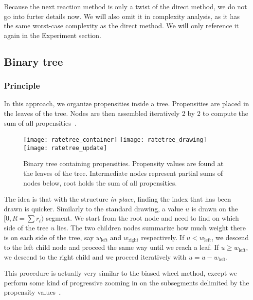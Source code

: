 Because the next reaction method is only a twist of the direct method, we do not go into furter details now. We will also omit it in complexity analysis, as it has the same worst-case complexity as the direct method. We will only reference it again in the Experiment section.

\subsection {Binary tree}

\subsubsection {Principle}

In this approach, we organize propensities inside a tree. Propensities are placed in the leaves of the tree. Nodes are then assembled iteratively 2 by 2 to compute the sum of all propensities~.

\begin{figure}[!h]
  \centering
  \begin{minipage}{0.8\textwidth}
    \texttt{[image: ratetree\_container]}
    \texttt{[image: ratetree\_drawing]}
    \texttt{[image: ratetree\_update]}
  \end{minipage}
  \caption {Binary tree containing propensities. Propensity values are found at the leaves of the tree. Intermediate nodes represent partial sums of nodes below, root holds the sum of all propensities.}
  \label {fig:binary_tree}
\end {figure}

The idea is that with the structure \emph{in place}, finding the index that has been drawn is quicker. Similarly to the standard drawing, a value $u$ is drawn on the $[0, R=\sum r_i)$ segment. We start from the root node and need to find on which side of the tree $u$ lies. The two children nodes summarize how much weight there is on each side of the tree, say $w_\textrm{left}$ and $w_\textrm{right}$ respectively. If $u < w_\textrm{left}$, we descend to the left child node and proceed the same way until we reach a leaf. If $u \geq w_\textrm{left}$, we descend to the right child and we proceed iteratively with $u = u - w_\textrm{left}$.

This procedure is actually very similar to the biased wheel method, except we perform some kind of progressive zooming in on the subsegments delimited by the propensity values~.

